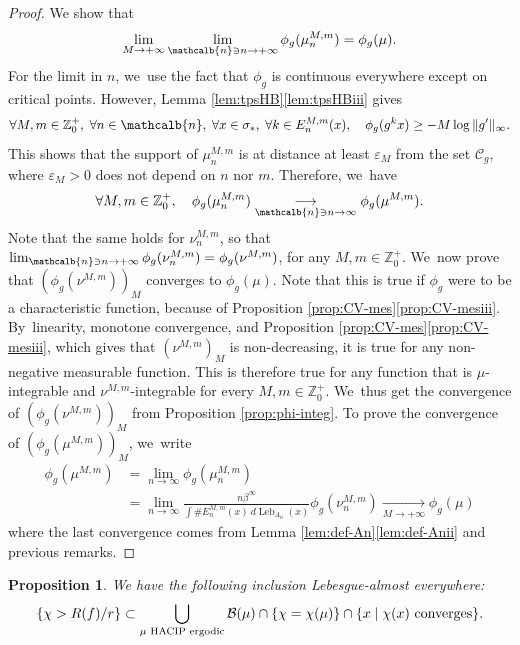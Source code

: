 \documentclass[JEP,XML,SOM,Unicode,NoFloatCountersInSection,published]{cedram}
\DeclareMathOperator{\Leb}{Leb}
\newcommand{\mcbn}{{\mathcalb{n}}}
\newtheorem{prop}[thm]{Proposition}
\theoremstyle{definition}
\newcommand{\bbZ}{{\mathbb{Z}}}
\begin{document}
\begin{proof}
We show that
\[
\lim_{M \to +\infty} \lim_{\mcbn \ni n \to +\infty} \phi_g(\mu_n^{M,m}) = \phi_g(\mu).
\]
For the limit in $n$, we~use the fact that $\phi_g$ is continuous everywhere except on critical points.
However, Lemma \ref{lem:tpsHB}\eqref{lem:tpsHBiii} gives
\[
\forall M,m \in \bbZ_0^+,\; \forall n \in \mcbn,\; \forall x \in \sigma_*,\; \forall k \in E_n^{M,m}(x),\quad \phi_g(g^k x) \geq -M \log \| g' \|_{\infty}.
\]
This shows that the support of $\mu_n^{M,m}$ is at distance at least $\varepsilon_M$ from the set $\mathcal{C}_g$, where $\varepsilon_M>0$ does not depend on $n$ nor $m$.
Therefore, we~have
\[
\forall M,m \in \bbZ_0^+,\quad \phi_g(\mu_n^{M,m}) \underset{\mcbn \ni n \to \infty}{\longrightarrow}
\phi_g(\mu^{M,m}).
\]
Note that the same holds for $\nu_n^{M,m}$, so that $\lim_{\mcbn \ni n \to +\infty}\phi_g(\nu_n^{M,m}) = \phi_g(\nu^{M,m})$, for any $M,m \in \bbZ_0^+$. We~now prove that $\left (\phi_g(\nu^{M,m}) \right)_M$ converges to $\phi_g(\mu)$.
Note that this is true if $\phi_g$ were to be a characteristic function, because of Proposition \ref{prop:CV-mes}\eqref{prop:CV-mesiii}. By~linearity, monotone convergence, and Proposition \ref{prop:CV-mes}\eqref{prop:CV-mesiii}, which gives that $\left (\nu^{M,m} \right)_M$ is non-decreasing, it is true for any non-negative measurable function.
This is therefore true for any function that is $\mu$-integrable and $\nu^{M,m}$-integrable for every $M,m \in \bbZ_0^+$. We~thus get the convergence of $\left (\phi_g(\nu^{M,m})\right)_M$ from Proposition \ref{prop:phi-integ}. To prove the convergence of $\left (\phi_g(\mu^{M,m})\right)_M$, we~write
\begin{align*}
\phi_g(\mu^{M,m}) &= \lim_{n \to \infty} \phi_g(\mu_n^{M,m})\\[-3pt]
&= \lim_{n \to \infty} \frac{n \beta^{\infty}}{\int \# E_n^{M,m}(x) \: d \Leb_{A_n}(x)} \phi_g(\nu_n^{M,m})
\underset{M \to +\infty}{\longrightarrow} \phi_g(\mu)
\end{align*}
where the last convergence comes from Lemma \ref{lem:def-An}\eqref{lem:def-Anii} and previous remarks.
\end{proof}

\label{ssec:bassins}

\begin{prop}
\label{prop:rec-bassins}
We have the following inclusion Lebesgue-almost everywhere:
\[
\left \{ \chi > R(f)/r \right \} \subset \bigcup_{\mu \textup{ HACIP ergodic}} \mathcal{B}(\mu) \cap \{ \chi = \chi(\mu) \} \cap \{ x \mid \chi(x) \textup{ converges} \}.
\]
\end{prop}
\end{document}
